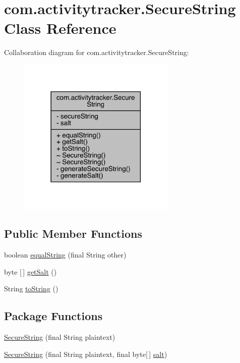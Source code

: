 \hypertarget{classcom_1_1activitytracker_1_1_secure_string}{}\section{com.\+activitytracker.\+Secure\+String Class Reference}
\label{classcom_1_1activitytracker_1_1_secure_string}


Collaboration diagram for com.\+activitytracker.\+Secure\+String\+:
\nopagebreak
\begin{figure}[H]
\begin{center}
\leavevmode
\includegraphics[width=213pt]{classcom_1_1activitytracker_1_1_secure_string__coll__graph}
\end{center}
\end{figure}
\subsection*{Public Member Functions}
\begin{DoxyCompactItemize}
\item 
boolean \mbox{\hyperlink{classcom_1_1activitytracker_1_1_secure_string_a8b5c3cac74b22ff0eb3c43a7ebd980f5}{equal\+String}} (final String other)
\item 
byte \mbox{[}$\,$\mbox{]} \mbox{\hyperlink{classcom_1_1activitytracker_1_1_secure_string_ab5369653852da122aba874f35cbda9a5}{get\+Salt}} ()
\item 
String \mbox{\hyperlink{classcom_1_1activitytracker_1_1_secure_string_aef531e12618c5c147adc52fda0d4add8}{to\+String}} ()
\end{DoxyCompactItemize}
\subsection*{Package Functions}
\begin{DoxyCompactItemize}
\item 
\mbox{\hyperlink{classcom_1_1activitytracker_1_1_secure_string_a889fcbf0c1f771962ac81886f49e389e}{Secure\+String}} (final String plaintext)
\item 
\mbox{\hyperlink{classcom_1_1activitytracker_1_1_secure_string_a04c2f0677ecd9af147428976a11c85e2}{Secure\+String}} (final String plaintext, final byte\mbox{[}$\,$\mbox{]} \mbox{\hyperlink{classcom_1_1activitytracker_1_1_secure_string_a8549ead1f186ff0c2520818b03d1cc21}{salt}})
\end{DoxyCompactItemize}
